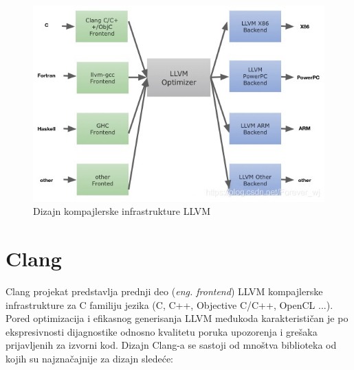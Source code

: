 \documentclass[12pt,oneside]{memoir}
\begin{document}
\begin{figure}[!h]
\begin{center}
\includegraphics[scale=0.4]{llvmDesign.jpg}
\end{center}
\caption{Dizajn kompajlerske infrastrukture LLVM}
\label{fig:exploded}
\end{figure}

\section{Clang}

Clang projekat predstavlja prednji deo (\textit{eng. frontend}) LLVM kompajlerske infrastrukture za C familiju jezika (C, C++, Objective C/C++, OpenCL ...).
Pored optimizacija i efikasnog generisanja LLVM međukoda karakterističan je po ekspresivnosti dijagnostike odnosno kvalitetu poruka upozorenja i grešaka prijavljenih za izvorni kod. Dizajn Clang-a se sastoji od mnoštva biblioteka od kojih su najznačajnije za dizajn sledeće:
\end{document}
